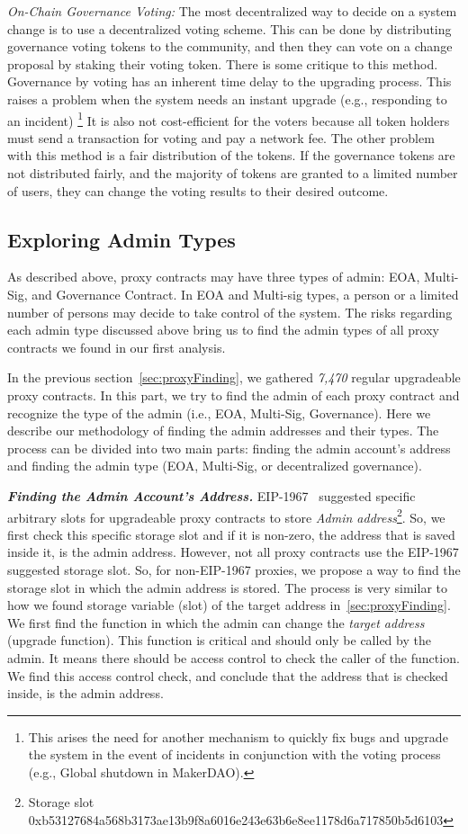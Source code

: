 \textit{On-Chain Governance Voting:}
The most decentralized way to decide on a system change is to use a decentralized voting scheme. This can be done by distributing governance voting tokens to the community, and then they can vote on a change proposal by staking their voting token. 
There is some critique to this method. Governance by voting has an inherent time delay to the upgrading process. This raises a problem when the system needs an instant upgrade (e.g., responding to an incident) \footnote{This arises the need for another mechanism to quickly fix bugs and upgrade the system in the event of incidents in conjunction with the voting process (e.g., Global shutdown in MakerDAO).}
It is also not cost-efficient for the voters because all token holders must send a transaction for voting and pay a network fee.
The other problem with this method is a fair distribution of the tokens. If the governance tokens are not distributed fairly, and the majority of tokens are granted to a limited number of users, they can change the voting results to their desired outcome.

\subsection{Exploring Admin Types}
As described above, proxy contracts may have three types of admin: EOA, Multi-Sig, and Governance Contract. In EOA and Multi-sig types, a person or a limited number of persons may decide to take control of the system. The risks regarding each admin type discussed above bring us to find the admin types of all proxy contracts we found in our first analysis.

In the previous section~\ref{sec:proxyFinding}, we gathered \textit{7,470} regular upgradeable proxy contracts. In this part, we try to find the admin of each proxy contract and recognize the type of the admin (i.e., EOA, Multi-Sig, Governance).
Here we describe our methodology of finding the admin addresses and their types. The process can be divided into two main parts: finding the admin account's address and finding the admin type (EOA, Multi-Sig, or decentralized governance).

\textbf{\emph{Finding the Admin Account's Address.}} EIP-1967~\cite{eip1967} suggested specific arbitrary slots for upgradeable proxy contracts to store \textit{Admin address}\footnote{Storage slot 0xb53127684a568b3173ae13b9f8a6016e243e63b6e8ee1178d6a717850b5d6103}. So, we first check this specific storage slot and if it is non-zero, the address that is saved inside it, is the admin address. 
However, not all proxy contracts use the EIP-1967 suggested storage slot. So, for non-EIP-1967 proxies, we propose a way to find the storage slot in which the admin address is stored. The process is very similar to how we found storage variable (slot) of the target address in~\ref{sec:proxyFinding}. We first find the function in which the admin can change the \textit{target address} (upgrade function). This function is critical and should only be called by the admin. It means there should be access control to check the caller of the function. We find this access control check, and conclude that the address that is checked inside, is the admin address.

